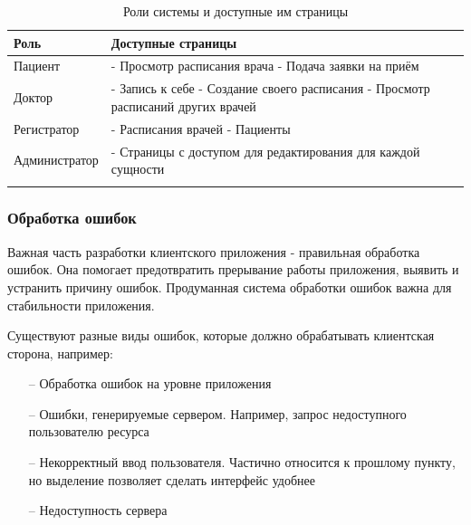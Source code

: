 \documentclass[a4paper,article]{article}
\begin{document}
    \begin{xltabular}{\textwidth} { |
        >{\hsize} X |
        >{\hsize} X | }

        \hline
        Роль
        & Доступные страницы \\

        \hline
        Пациент
        & - Просмотр расписания врача \newline - Подача заявки на приём \\

        \hline
        Доктор
        & - Запись к себе \newline - Создание своего расписания \newline - Просмотр расписаний других врачей \\

        \hline
        Регистратор
        & - Расписания врачей \newline - Пациенты \\

        \hline
        Администратор
        & - Страницы с доступом для редактирования для каждой сущности \\

        \hline

        \caption{\centering Роли системы и доступные им страницы}

        \label{tab:Роли в системе и доступные им страницы}
    \end{xltabular}

    \subsubsection{Обработка ошибок}\label{Проектирование клиента. Обработка ошибок}

    Важная часть разработки клиентского приложения - правильная обработка ошибок. Она помогает предотвратить прерывание работы приложения, выявить и устранить причину ошибок. Продуманная система обработки ошибок важна для стабильности приложения.

    Существуют разные виды ошибок, которые должно обрабатывать клиентская сторона, например:

    \begin{itemize}[nolistsep]
        \item[--] Обработка ошибок на уровне приложения
        \item[--] Ошибки, генерируемые сервером. Например, запрос недоступного пользователю ресурса
        \item[--] Некорректный ввод пользователя. Частично относится к прошлому пункту, но выделение позволяет сделать интерфейс удобнее
        \item[--] Недоступность сервера
    \end{itemize}
\end{document}
